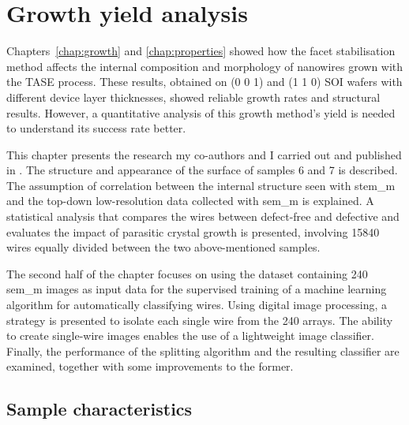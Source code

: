 \chapter{Growth yield analysis}
\label{chap:yield_analysis}

Chapters~\ref{chap:growth} and \ref{chap:properties} showed how the  facet stabilisation method affects the internal composition and morphology of nanowires grown with the \acf{TASE} process. These results, obtained on \hkl(0 0 1) and \hkl(1 1 0) \acf{SOI} wafers with different device layer thicknesses, showed reliable growth rates and structural results. However, a quantitative analysis of this growth method's yield is needed to understand its success rate better. 

This chapter presents the research my co-authors and I carried out and published in \cite{Brugnolotto2023_2, Brugnolotto2024}. The structure and appearance of the surface of samples 6 and 7 is described. The assumption of correlation between the internal structure seen with \acf{stem_m} and the top-down low-resolution data collected with \acf{sem_m} is explained. A statistical analysis that compares the wires between defect-free and defective and evaluates the impact of parasitic crystal growth is presented, involving \num{15840} wires equally divided between the two above-mentioned samples. 

The second half of the chapter focuses on using the dataset containing \num{240} \acs{sem_m} images as input data for the supervised training of a machine learning algorithm for automatically classifying wires. Using digital image processing, a strategy is presented to isolate each single wire from the \num{240} arrays. The ability to create single-wire images enables the use of a lightweight image classifier. Finally, the performance of the splitting algorithm and the resulting classifier are examined, together with some improvements to the former.

\section{Sample characteristics}


